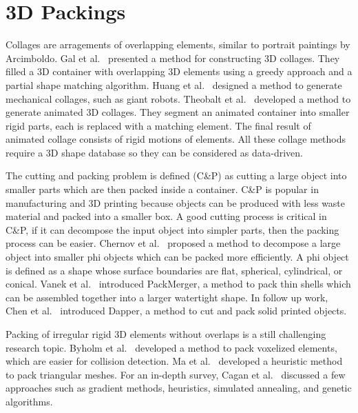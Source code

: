 
\section{3D Packings}

Collages are arragements of overlapping elements, similar to
portrait paintings by Arcimboldo.
Gal et al.~\cite{Gal2007B} presented a method for constructing 3D
collages.  They filled a 3D container with overlapping 3D elements using a greedy
approach and a partial shape matching algorithm.
Huang et al.~\cite{Huang2014} designed a method
to generate mechanical collages, such as giant robots.
Theobalt et al.~\cite{Theobalt2007}
developed a method to generate animated 3D collages.
They segment an animated container
into smaller rigid parts, each is replaced with a matching element.
The final result of animated collage consists of rigid motions of elements.
All these collage methods require a 3D shape database so they can be considered as data-driven. 

The cutting and packing problem is defined (C\&P) as cutting a large object into smaller parts 
which are then packed inside a container.
C\&P is popular in manufacturing and 3D printing because
objects can be produced with less waste material and packed into a smaller box.
A good cutting process is critical in C\&P, if it can decompose the input object
into simpler parts, then the packing process can be easier.
Chernov et al.~\cite{Chernov2010} proposed a method to decompose a large object
into smaller phi objects which can be packed more efficiently.
A phi object is defined as a shape whose surface boundaries 
are flat, spherical, cylindrical, or conical.
Vanek et al.~\cite{Vanek2014} introduced PackMerger,
a method to pack thin shells which can be assembled together into
a larger watertight shape.
In follow up work, Chen et al.~\cite{Chen2015} introduced Dapper,
a method to cut and pack solid printed objects.

Packing of irregular rigid 3D elements without overlaps 
is a still challenging research topic.
Byholm et al.~\cite{Byholm2009} developed a method
to pack voxelized elements, which are easier for collision detection.
Ma et al.~\cite{Ma2018} developed a heuristic method
to pack triangular meshes.
For an in-depth survey, Cagan et al.~\cite{Cagan2002} discussed a few approaches such as
gradient methods, heuristics, simulated annealing, and genetic algorithms.


